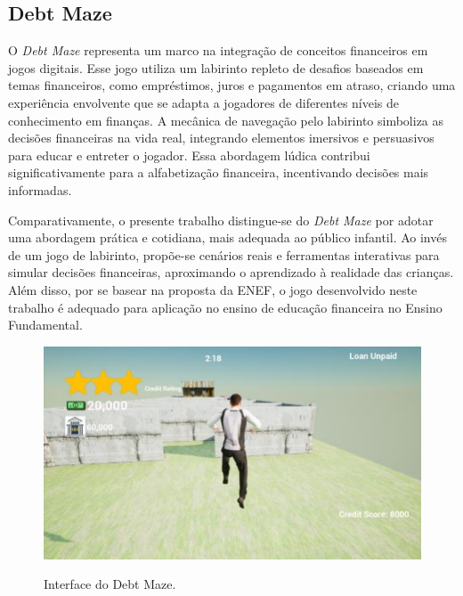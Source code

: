 \subsection{Debt Maze}
O \textit{Debt Maze} \cite{Debt_Maze} representa um marco na integração de conceitos financeiros em jogos digitais. Esse jogo utiliza um labirinto repleto de desafios baseados em temas financeiros, como empréstimos, juros e pagamentos em atraso, criando uma experiência envolvente que se adapta a jogadores de diferentes níveis de conhecimento em finanças. A mecânica de navegação pelo labirinto simboliza as decisões financeiras na vida real, integrando elementos imersivos e persuasivos para educar e entreter o jogador. Essa abordagem lúdica contribui significativamente para a alfabetização financeira, incentivando decisões mais informadas.

Comparativamente, o presente trabalho distingue-se do \textit{Debt Maze} por adotar uma abordagem prática e cotidiana, mais adequada ao público infantil. Ao invés de um jogo de labirinto, propõe-se cenários reais e ferramentas interativas para simular decisões financeiras, aproximando o aprendizado à realidade das crianças. Além disso, por se basear na proposta da ENEF, o jogo desenvolvido neste trabalho é adequado para aplicação no ensino de educação financeira no Ensino Fundamental.



\begin{figure}[ht]
	\centering
	\caption{Interface do Debt Maze.}
	\includegraphics[scale=0.9]{Textuais/Pictures/debt-maze-1.png}
	\label{fig:debt-maze-1}
\end{figure}

